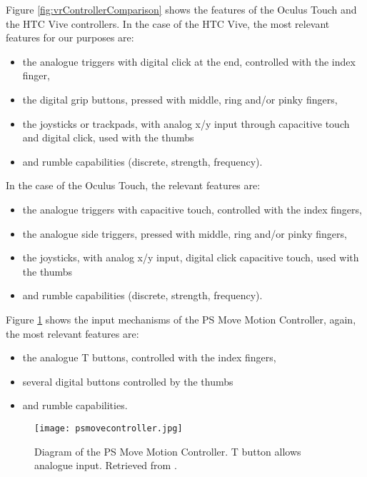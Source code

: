 Figure \ref{fig:vrControllerComparison} shows the features of the Oculus Touch and the HTC Vive controllers. In the case of the HTC Vive, the most relevant features for our purposes are:

\begin{itemize}
\item the analogue triggers with digital click at the end, controlled with the index finger, 
\item the digital grip buttons, pressed with middle, ring and/or pinky fingers,
\item the joysticks or trackpads, with analog x/y input through capacitive touch and digital click, used with the thumbs
\item and rumble capabilities (discrete, strength, frequency).
\end{itemize}

In the case of the Oculus Touch, the relevant features are:

\begin{itemize}
\item the analogue triggers with capacitive touch, controlled with the index fingers, 
\item the analogue side triggers, pressed with middle, ring and/or pinky fingers,
\item the joysticks, with analog x/y input, digital click capacitive touch, used with the thumbs
\item and rumble capabilities (discrete, strength, frequency).
\end{itemize}

Figure \ref{fig:psmoveDiagram} shows the input mechanisms of the PS Move Motion Controller, again, the most relevant features are:

\begin{itemize}
\item the analogue T buttons, controlled with the index fingers,
\item several digital buttons controlled by the thumbs
\item and rumble capabilities.
\end{itemize}

\begin{figure}[H]
\centering
\texttt{[image: psmovecontroller.jpg]}
\caption{Diagram of the PS Move Motion Controller. T button allows analogue input. Retrieved from \parencite{psmoveDiagram}.}
\label{fig:psmoveDiagram}
\end{figure}

